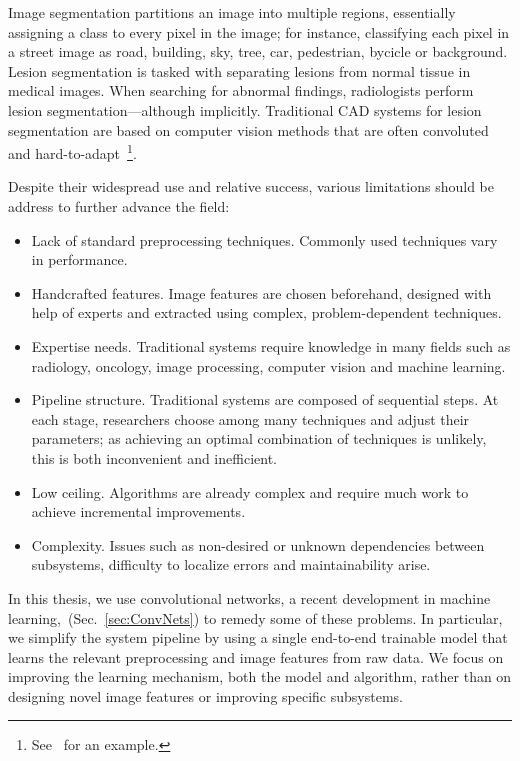 Image segmentation partitions an image into multiple regions, essentially assigning a class to every pixel in the image; for instance, classifying each pixel in a street image as road, building, sky, tree, car, pedestrian, bycicle or background. Lesion segmentation is tasked with separating lesions from normal tissue in medical images. When searching for abnormal findings, radiologists perform lesion segmentation---although implicitly. Traditional CAD systems for lesion segmentation are based on computer vision methods that are often convoluted and hard-to-adapt~\footnote{See~\cite{Ashraf2013} for an example.}. 

Despite their widespread use and relative success, various limitations should be address to further advance the field:
\begin{itemize}
	\item Lack of standard preprocessing techniques. Commonly used techniques vary in performance.
	\item Handcrafted features. Image features are chosen beforehand, designed with help of experts and extracted using complex, problem-dependent techniques.
	\item Expertise needs. Traditional systems require knowledge in many fields such as radiology, oncology, image processing, computer vision and machine learning.
	\item Pipeline structure. Traditional systems are composed of sequential steps. At each stage, researchers choose among many techniques and adjust their parameters; as achieving an optimal combination of techniques is unlikely, this is both inconvenient and inefficient.
	\item Low ceiling. Algorithms are already complex and require much work to achieve incremental improvements.
	\item Complexity. Issues such as non-desired or unknown dependencies between subsystems, difficulty to localize errors and maintainability arise. 
\end{itemize}

In this thesis, we use convolutional networks, a recent development in machine learning,~(Sec.~\ref{sec:ConvNets}) to remedy some of these problems. In particular, we simplify the system pipeline by using a single end-to-end trainable model that learns the relevant preprocessing and image features from raw data. We focus on improving the learning mechanism, both the model and algorithm, rather than on designing novel image features or improving specific subsystems.
